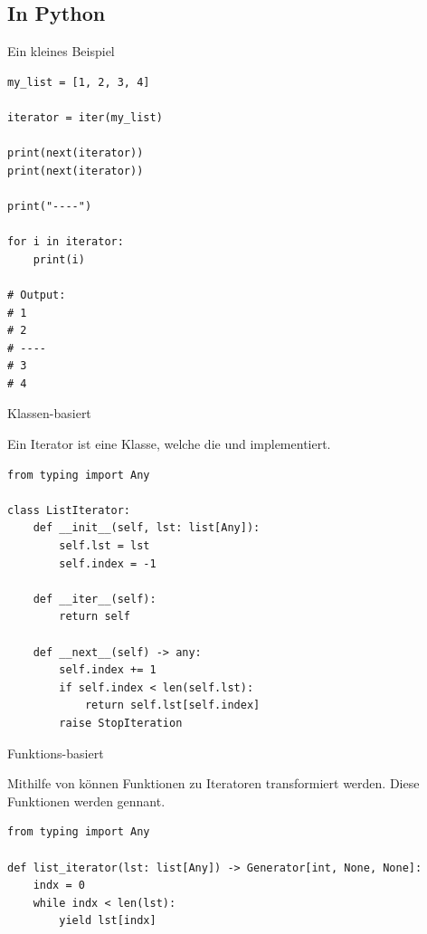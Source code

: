 \documentclass[12pt, aspectratio=169, usepdftitle=false, handout]{beamer}
\newcommand{\pp}[1]{\lpl{#1}}
\begin{document}


\subsection{In Python}

\begin{frame}[fragile]{Ein kleines Beispiel}

    \begin{lstlisting}[language=pytiny]
my_list = [1, 2, 3, 4]

iterator = iter(my_list)

print(next(iterator))
print(next(iterator))

print("----")

for i in iterator:
    print(i)

# Output:
# 1
# 2
# ----
# 3
# 4
    \end{lstlisting}

\end{frame}

\begin{frame}[fragile]{Klassen-basiert}

    Ein Iterator ist eine Klasse, welche die  \pp{__iter()__} und \pp{__next()__} implementiert.

    \medskip

    \begin{lstlisting}[language=pytiny]
from typing import Any

class ListIterator:
    def __init__(self, lst: list[Any]):
        self.lst = lst
        self.index = -1

    def __iter__(self):
        return self

    def __next__(self) -> any:
        self.index += 1
        if self.index < len(self.lst):
            return self.lst[self.index]
        raise StopIteration

    \end{lstlisting}

\end{frame}

\begin{frame}[fragile]{Funktions-basiert}

    Mithilfe von \pp{yield} können Funktionen zu Iteratoren transformiert werden. Diese Funktionen werden  gennant.

    \medskip

    \begin{lstlisting}[language=pytiny]
from typing import Any

def list_iterator(lst: list[Any]) -> Generator[int, None, None]:
    indx = 0
    while indx < len(lst):
        yield lst[indx]

    \end{lstlisting}

\end{frame}
\end{document}
